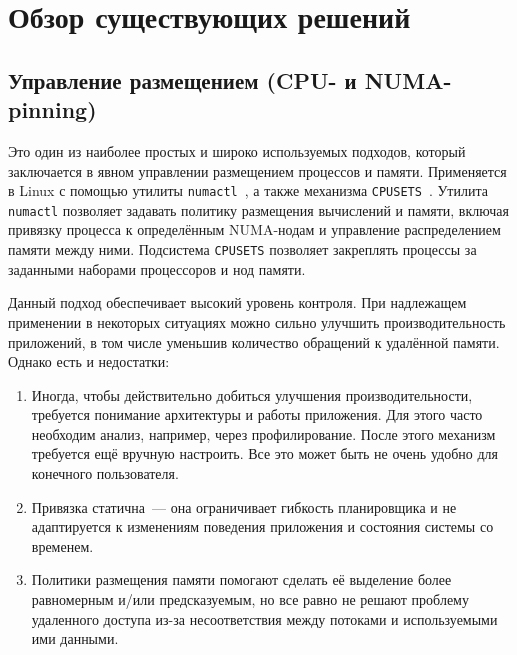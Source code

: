 \section{Обзор существующих решений}
\label{sec:Chapter2} 


\subsection{Управление размещением (CPU- и NUMA-pinning)}

Это один из наиболее простых и широко используемых подходов, который заключается в явном управлении размещением процессов и памяти. Применяется в Linux с помощью утилиты \texttt{numactl}~\cite{numactl}, а также механизма \texttt{CPUSETS}~\cite{CPUSETS}. Утилита \texttt{numactl} позволяет задавать политику размещения вычислений и памяти, включая привязку процесса к определённым NUMA-нодам и управление распределением памяти между ними. Подсистема \texttt{CPUSETS} позволяет закреплять процессы за заданными наборами процессоров и нод памяти.

Данный подход обеспечивает высокий уровень контроля. При надлежащем применении в некоторых ситуациях можно сильно улучшить производительность приложений, в том числе уменьшив количество обращений к удалённой памяти. Однако есть и недостатки:
\begin{enumerate}
    \item\label{itm:pinning1} Иногда, чтобы действительно добиться улучшения производительности, требуется понимание архитектуры и работы приложения. Для этого часто необходим анализ, например, через профилирование. После этого механизм требуется ещё вручную настроить. Все это может быть не очень удобно для конечного пользователя.
    \item\label{itm:pinning2} Привязка статична~--- она ограничивает гибкость планировщика и не адаптируется к изменениям поведения приложения и состояния системы со временем.
    \item\label{itm:pinning3} Политики размещения памяти помогают сделать её выделение более равномерным и/или предсказуемым, но все равно не решают проблему удаленного доступа из-за несоответствия между потоками и используемыми ими данными.
\end{enumerate}

